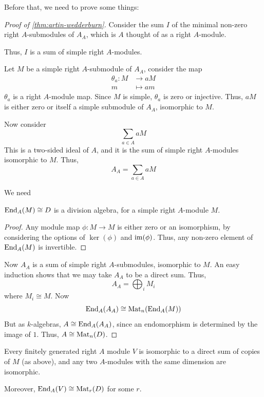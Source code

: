 \documentclass{article}
\begin{document}
Before that, we need to prove some things:

\begin{proof}
    [Proof of \cref{thm:artin-wedderburn}]
    Consider the sum \(I\) of the minimal non-zero right \(A\)-submodules of \(A_A\), which is \(A\) thought of as a right \(A\)-module.
    
    Thus, \(I\) is a sum of simple right \(A\)-modules. 
    
    Let \(M\) be a simple right \(A\)-submodule of \(A_A\), consider the map
    \begin{align*}
        \theta_a : M &\to aM \\
        m &\mapsto am
    \end{align*}
    \(\theta_a\) is a right \(A\)-module map. Since \(M\) is simple, \(\theta_a\) is zero or injective. Thus, \(aM\) is either zero or itself a simple submodule of \(A_A\), isomorphic to \(M\).

    Now consider
    \[\sum_{a \in A}aM\]
    This is a two-sided ideal of \(A\), and it is the sum of simple right \(A\)-modules isomorphic to \(M\). Thus,
    \[A_A = \sum_{a \in A}aM\]

    We need

    \begin{lemma}
         \(\operatorname{End}_A(M) \cong D\) is a division algebra, for a simple right \(A\)-module \(M\).
    \end{lemma}

    \begin{proof}
        Any module map \(\phi : M \to M\) is either zero or an isomorphism, by considering the options of \(\ker(\phi)\) and \(\operatorname{im}(\phi)\). Thus, any non-zero element of \(\operatorname{End}_A(M)\) is invertible.
    \end{proof}

    Now \(A_A\) is a sum of simple right \(A\)-submodules, isomorphic to \(M\). An easy induction shows that we may take \(A_A\) to be a direct sum. Thus,
    \[A_A = \bigoplus_i M_i\]
    where \(M_i \cong M\). Now
    \[\operatorname{End}_A(A_A) \cong \operatorname{Mat}_n(\operatorname{End}_A(M))\]
    But as \(k\)-algebras, \(A \cong \operatorname{End}_A(A_A)\), since an endomorphism is determined by the image of \(1\). Thus, \(A \cong \operatorname{Mat}_n(D)\).
\end{proof}

\begin{corollary}
    Every finitely generated right \(A\) module \(V\) is isomorphic to a direct sum of copies of \(M\) (as above), and any two \(A\)-modules with the same dimension are isomorphic.

    Moreover, \(\operatorname{End}_A(V) \cong \operatorname{Mat}_r(D)\) for some \(r\).
\end{corollary}
\end{document}
